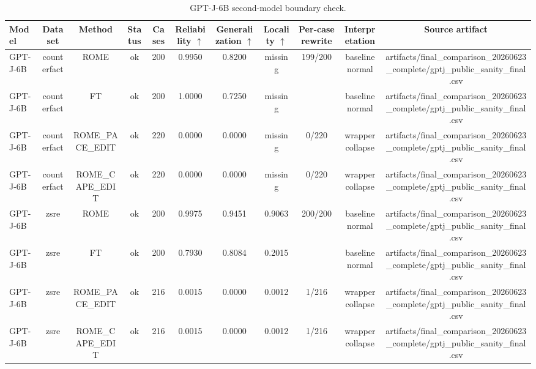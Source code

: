 \begin{table}[t]
\centering
\scriptsize
\caption{GPT-J-6B second-model boundary check.}
\label{tab:gptj-boundary}
\begin{tabular}{lcccccccccc}
\toprule
Model & Dataset & Method & Status & Cases & Reliability $\uparrow$ & Generalization $\uparrow$ & Locality $\uparrow$ & Per-case rewrite & Interpretation & Source artifact \\
\midrule
GPT-J-6B & counterfact & ROME & ok & 200 & 0.9950 & 0.8200 & missing & 199/200 & baseline normal & artifacts/final\_comparison\_20260623\_complete/gptj\_public\_sanity\_final.csv \\
GPT-J-6B & counterfact & FT & ok & 200 & 1.0000 & 0.7250 & missing &  & baseline normal & artifacts/final\_comparison\_20260623\_complete/gptj\_public\_sanity\_final.csv \\
GPT-J-6B & counterfact & ROME\_PACE\_EDIT & ok & 220 & 0.0000 & 0.0000 & missing & 0/220 & wrapper collapse & artifacts/final\_comparison\_20260623\_complete/gptj\_public\_sanity\_final.csv \\
GPT-J-6B & counterfact & ROME\_CAPE\_EDIT & ok & 220 & 0.0000 & 0.0000 & missing & 0/220 & wrapper collapse & artifacts/final\_comparison\_20260623\_complete/gptj\_public\_sanity\_final.csv \\
GPT-J-6B & zsre & ROME & ok & 200 & 0.9975 & 0.9451 & 0.9063 & 200/200 & baseline normal & artifacts/final\_comparison\_20260623\_complete/gptj\_public\_sanity\_final.csv \\
GPT-J-6B & zsre & FT & ok & 200 & 0.7930 & 0.8084 & 0.2015 &  & baseline normal & artifacts/final\_comparison\_20260623\_complete/gptj\_public\_sanity\_final.csv \\
GPT-J-6B & zsre & ROME\_PACE\_EDIT & ok & 216 & 0.0015 & 0.0000 & 0.0012 & 1/216 & wrapper collapse & artifacts/final\_comparison\_20260623\_complete/gptj\_public\_sanity\_final.csv \\
GPT-J-6B & zsre & ROME\_CAPE\_EDIT & ok & 216 & 0.0015 & 0.0000 & 0.0012 & 1/216 & wrapper collapse & artifacts/final\_comparison\_20260623\_complete/gptj\_public\_sanity\_final.csv \\
\bottomrule
\end{tabular}
\end{table}
